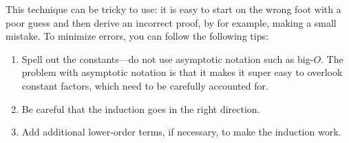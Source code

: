 \begin{cluster}
\label{grp:imp:analysis::recurrences::technique}

\begin{important}
\label{imp:analysis::recurrences::technique}
This technique can be tricky to use: it is easy to start on the wrong
foot with a poor guess and then derive an incorrect proof, by for example,
making a small mistake.
To minimize errors, you can follow the following tips:
\begin{enumerate}
\item Spell out the constants---do not use asymptotic notation such as
  big-$O$.  The problem with asymptotic notation is that it makes it
  super easy to overlook constant factors, which need to be carefully
  accounted for.

\item Be careful that the induction goes in the right direction.

\item Add additional lower-order terms, if necessary, to make the
  induction work.
\end{enumerate}

\end{important}
\end{cluster}

